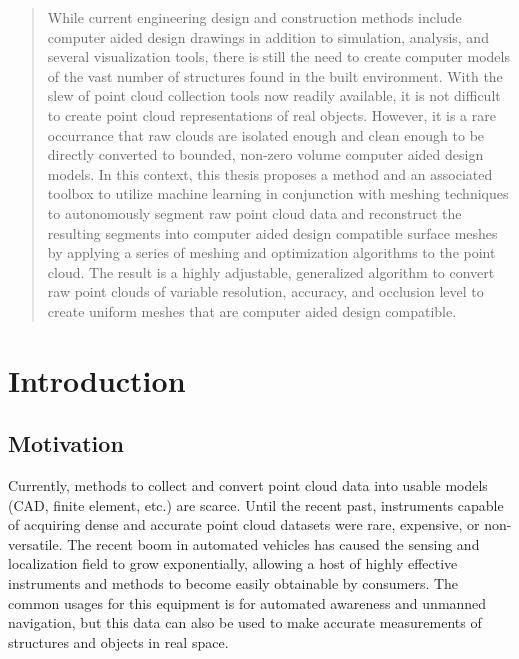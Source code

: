 \documentclass[12pt]{drexelthesis}
\let\Oldsection\section
\renewcommand{\section}{\FloatBarrier\Oldsection}
\begin{document}
\begin{preliminary}
\begin{abstract}
While current engineering design and construction methods include computer aided design drawings in addition to simulation, analysis, and several visualization tools, there is still the need to create computer models of the vast number of structures found in the built environment. With the slew of point cloud collection tools now readily available, it is not difficult to create point cloud representations of real objects. However, it is a rare occurrance that raw clouds are isolated enough and clean enough to be directly converted to bounded, non-zero volume computer aided design models. In this context, this thesis proposes a method and an associated toolbox to utilize machine learning in conjunction with meshing techniques to autonomously segment raw point cloud data and reconstruct the resulting segments into computer aided design compatible surface meshes by applying a series of meshing and optimization algorithms to the point cloud. The result is a highly adjustable, generalized algorithm to convert raw point clouds of variable resolution, accuracy, and occlusion level to create uniform meshes that are computer aided design compatible.

\end{abstract}

\clearpage
\end{preliminary}
\thispagestyle{empty}
\newpage


\setcounter{page}{0}





\chapter{Introduction}
\label{chap:introduction}
\section{Motivation}
Currently, methods to collect and convert point cloud data into usable models (CAD, finite element, etc.) are scarce. Until the recent past, instruments capable of acquiring dense and accurate point cloud datasets were rare, expensive, or non-versatile. The recent boom in automated vehicles has caused the sensing and localization field to grow exponentially, allowing a host of highly effective instruments and methods to become easily obtainable by consumers. The common usages for this equipment is for automated awareness and unmanned navigation, but this data can also be used to make accurate measurements of structures and objects in real space.
\end{document}
